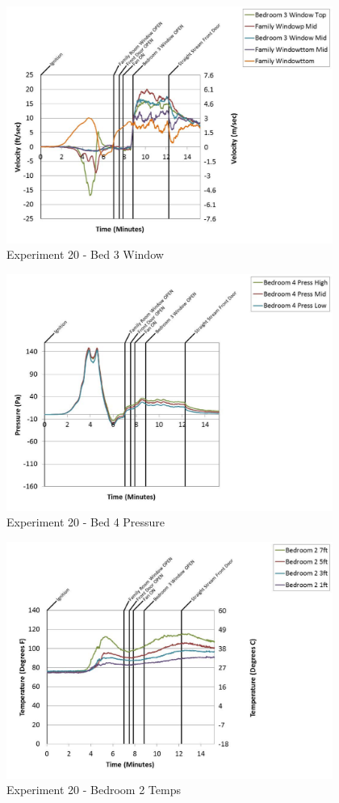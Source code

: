 \documentclass{article}
\begin{document}
\begin{appendices}
	\clearpage

	\begin{figure}[h!]
		\centering
		\includegraphics[height=3.05in]{0_Images/Results_Charts/Exp_20_Charts/Bed3Window.pdf}
		\caption{Experiment 20 - Bed 3 Window}
	\end{figure}
 

	\begin{figure}[h!]
		\centering
		\includegraphics[height=3.05in]{0_Images/Results_Charts/Exp_20_Charts/Bed4Pressure.pdf}
		\caption{Experiment 20 - Bed 4 Pressure}
	\end{figure}
 
	\clearpage

	\begin{figure}[h!]
		\centering
		\includegraphics[height=3.05in]{0_Images/Results_Charts/Exp_20_Charts/Bedroom2Temps.pdf}
		\caption{Experiment 20 - Bedroom 2 Temps}
	\end{figure}
 


\end{appendices}
\end{document}
